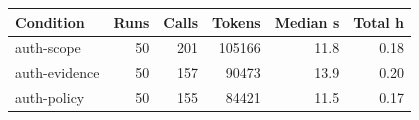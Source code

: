 \begin{tabular}{lrrrrr}
\toprule
Condition & Runs & Calls & Tokens & Median s & Total h \\
\midrule
auth-scope & 50 & 201 & 105166 & 11.8 & 0.18 \\
auth-evidence & 50 & 157 & 90473 & 13.9 & 0.20 \\
auth-policy & 50 & 155 & 84421 & 11.5 & 0.17 \\
\bottomrule
\end{tabular}
